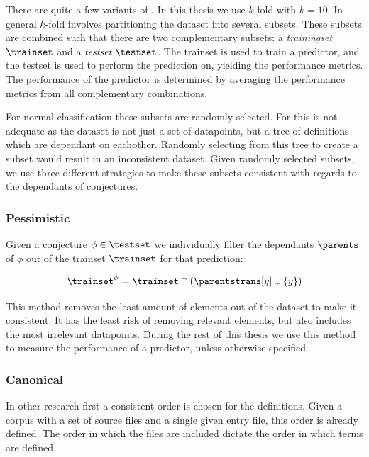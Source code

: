 There are quite a few variants of \crossvalidation.
In this thesis we use $k$-fold \crossvalidation with $k = 10$.
In general $k$-fold \crossvalidation involves partitioning the dataset into several subsets.
These subsets are combined such that there are two complementary subsets: a \emph{trainingset} $\trainset$ and a \emph{testset} $\testset$.
The trainset is used to train a predictor, and the testset is used to perform the prediction on, yielding the performance metrics.
The performance of the predictor is determined by averaging the performance metrics from all complementary combinations.


For normal classification these subsets are randomly selected.
For \premiseselection this is not adequate as the dataset is not just a set of datapoints, but a tree of definitions which are dependant on eachother.
Randomly selecting from this tree to create a subset would result in an inconsistent dataset.
Given randomly selected subsets, we use three different strategies to make these subsets consistent with regards to the dependants of conjectures.

\subsubsection{Pessimistic}
Given a conjecture $\phi \in \testset$ we individually filter the dependants $\parents$ of $\phi$ out of the trainset $\trainset$ for that prediction:
\begin{definition}
  \[
    \trainset^{\phi} = \trainset \cap (\parentstrans[y] \cup \{y\})
  \]
\end{definition}
This method removes the least amount of elements out of the dataset to make it consistent.
It has the least risk of removing relevant elements, but also includes the most irrelevant datapoints.
During the rest of this thesis we use this method to measure the performance of a predictor, unless otherwise specified.

\subsubsection{Canonical}
In other research first a consistent order is chosen for the definitions.
Given a corpus with a set of source files and a single given entry file, this order is already defined.
The order in which the files are included dictate the order in which terms are defined.

